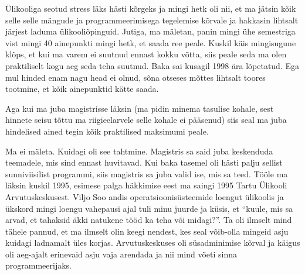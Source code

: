 Ülikooliga seotud stress läks hästi kõrgeks ja mingi hetk oli nii, et ma jätsin 
kõik selle selle mängude ja  programmeerimisega tegelemise kõrvale ja hakkasin 
lihtsalt järjest laduma ülikooliõpinguid. Jutiga, ma mäletan, panin mingi ühe 
semestriga vist mingi 40 ainepunkti mingi hetk, 
et saada ree peale. Kuskil käis mingisugune klõps, et kui ma varem ei suutnud 
ennast  kokku võtta, siis peale seda ma olen praktiliselt kogu aeg seda teha 
suutnud. Baka sai kusagil 1998 ära lõpetatud. Ega mul hinded enam nagu head ei 
olnud,  sõna otseses mõttes lihtsalt toores tootmine, et kõik ainepunktid 
kätte saada. 

Aga kui ma juba magistrisse läksin (ma pidin minema tasulise kohale, sest 
hinnete seisu tõttu ma riigieelarvele selle kohale ei pääsenud) siis seal ma 
juba  hindelised ained tegin kõik praktilised maksimumi peale. 


Ma ei mäleta. Kuidagi oli see tahtmine. Magistris sa said juba keskenduda 
teemadele, mis sind ennast huvitavad. Kui baka tasemel oli hästi palju sellist 
sunniviisilist programmi, siis magistris sa juba valid ise, mis sa teed. Tööle 
ma läksin kuskil 1995, esimese palga häkkimise eest ma saingi 1995 Tartu 
Ülikooli Arvutuskeskusest. Viljo 
Soo andis operatsioonisüsteemide loengut ülikoolis ja ükskord 
mingi loengu vahepausi ajal tuli minu juurde ja küsis, et \enquote{kuule, mis 
sa arvad, et tahaksid äkki natukene tööd ka teha või midagi?}. Ta oli ilmselt 
mind tähele pannud, et ma ilmselt olin keegi nendest, kes seal võib-olla 
mingeid asju  kuidagi ladnamalt üles korjas. Arvutuskeskuses oli süsadminimise 
kõrval ja  käigus oli aeg-ajalt erinevaid asju vaja arendada ja nii mind võeti 
sinna programmeerijaks. 


